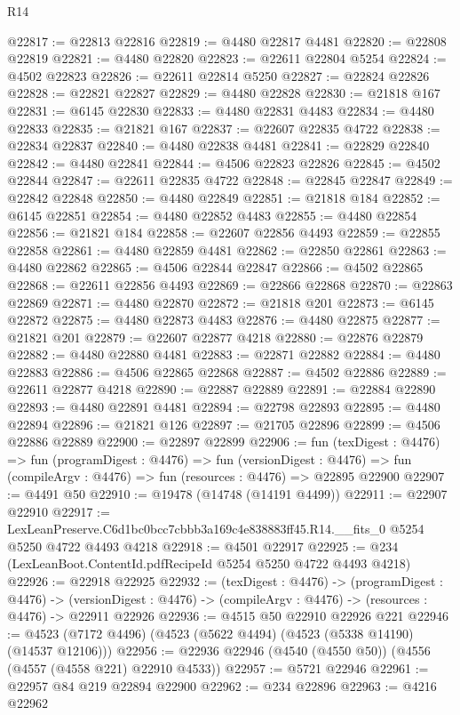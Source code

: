\begin{lexlean}{R14}
\begin{coremodule}
@22817 := @22813 @22816
@22819 := @4480 @22817 @4481
@22820 := @22808 @22819
@22821 := @4480 @22820
@22823 := @22611 @22804 @5254
@22824 := @4502 @22823
@22826 := @22611 @22814 @5250
@22827 := @22824 @22826
@22828 := @22821 @22827
@22829 := @4480 @22828
@22830 := @21818 @167
@22831 := @6145 @22830
@22833 := @4480 @22831 @4483
@22834 := @4480 @22833
@22835 := @21821 @167
@22837 := @22607 @22835 @4722
@22838 := @22834 @22837
@22840 := @4480 @22838 @4481
@22841 := @22829 @22840
@22842 := @4480 @22841
@22844 := @4506 @22823 @22826
@22845 := @4502 @22844
@22847 := @22611 @22835 @4722
@22848 := @22845 @22847
@22849 := @22842 @22848
@22850 := @4480 @22849
@22851 := @21818 @184
@22852 := @6145 @22851
@22854 := @4480 @22852 @4483
@22855 := @4480 @22854
@22856 := @21821 @184
@22858 := @22607 @22856 @4493
@22859 := @22855 @22858
@22861 := @4480 @22859 @4481
@22862 := @22850 @22861
@22863 := @4480 @22862
@22865 := @4506 @22844 @22847
@22866 := @4502 @22865
@22868 := @22611 @22856 @4493
@22869 := @22866 @22868
@22870 := @22863 @22869
@22871 := @4480 @22870
@22872 := @21818 @201
@22873 := @6145 @22872
@22875 := @4480 @22873 @4483
@22876 := @4480 @22875
@22877 := @21821 @201
@22879 := @22607 @22877 @4218
@22880 := @22876 @22879
@22882 := @4480 @22880 @4481
@22883 := @22871 @22882
@22884 := @4480 @22883
@22886 := @4506 @22865 @22868
@22887 := @4502 @22886
@22889 := @22611 @22877 @4218
@22890 := @22887 @22889
@22891 := @22884 @22890
@22893 := @4480 @22891 @4481
@22894 := @22798 @22893
@22895 := @4480 @22894
@22896 := @21821 @126
@22897 := @21705 @22896
@22899 := @4506 @22886 @22889
@22900 := @22897 @22899
@22906 := fun (texDigest : @4476) =>
  fun (programDigest : @4476) =>
  fun (versionDigest : @4476) =>
  fun (compileArgv : @4476) => fun (resources : @4476) => @22895 @22900
@22907 := @4491 @50
@22910 := @19478 (@14748 (@14191 @4499))
@22911 := @22907 @22910
@22917 := LexLeanPreserve.C6d1bc0bcc7cbbb3a169c4e838883ff45.R14.__fits_0
    @5254
    @5250
    @4722
    @4493
    @4218
@22918 := @4501 @22917
@22925 := @234 (LexLeanBoot.ContentId.pdfRecipeId @5254 @5250 @4722 @4493 @4218)
@22926 := @22918 @22925
@22932 := (texDigest : @4476) ->
  (programDigest : @4476) ->
  (versionDigest : @4476) -> (compileArgv : @4476) -> (resources : @4476) -> @22911 @22926
@22936 := @4515 @50 @22910 @22926 @221
@22946 := @4523 (@7172 @4496) (@4523 (@5622 @4494) (@4523 (@5338 @14190) (@14537 @12106)))
@22956 := @22936 @22946 (@4540 (@4550 @50)) (@4556 (@4557 (@4558 @221) @22910 @4533))
@22957 := @5721 @22946
@22961 := @22957 @84 @219 @22894 @22900
@22962 := @234 @22896
@22963 := @4216 @22962

\end{coremodule}
\end{lexlean}
